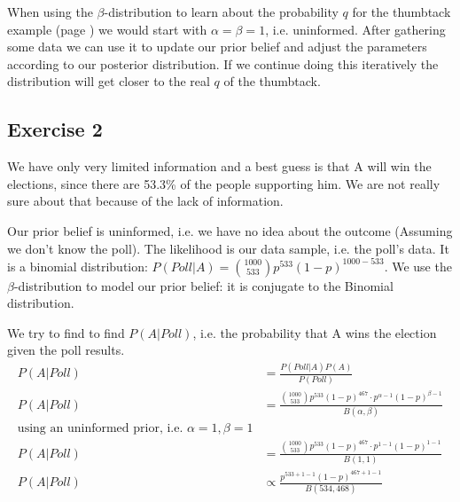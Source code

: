 \documentclass[../main/Notes.tex]{subfiles}
\begin{document}
\bigskip

When using the $\beta$-distribution to learn about the probability $q$ for the thumbtack example (page \pageref{example:Thumbtack Toss}) we would start with $\alpha=\beta=1$, i.e. uninformed. After gathering some data we can use it to update our prior belief and adjust the parameters according to our posterior distribution. If we continue doing this iteratively the distribution will get closer to the real $q$ of the thumbtack. %


\subsection*{Exercise 2}
We have only very limited information and a best guess is that A will win the elections, since there are 53.3\% of the people supporting him. We are not really sure about that because of the lack of information.

Our prior belief is uninformed, i.e. we have no idea about the outcome (Assuming we don't know the poll). The likelihood is our data sample, i.e. the poll's data. It is a binomial distribution: $P(Poll|A) = \binom{1000}{533} p^{533}(1-p)^{1000-533}$. We use the $\beta$-distribution to model our prior belief: it is conjugate to the Binomial distribution. 

We try to find to find $P(A|Poll)$, i.e. the probability that A wins the election given the poll results.
\begin{align*}
P(A|Poll) &= \frac{P(Poll|A)P(A)}{P(Poll)}\\
P(A|Poll) &= \frac{\binom{1000}{533}p^{533}(1-p)^{467} \cdot p^{\alpha-1}(1-p)^{\beta-1}}{B(\alpha,\beta)}\\
\text{using an uninformed prior, i.e. }\alpha=1, \beta=1\\
P(A|Poll) &= \frac{\binom{1000}{533}p^{533}(1-p)^{467} \cdot p^{1-1}(1-p)^{1-1}}{B(1,1)}\\
P(A|Poll) &\propto \frac{p^{533+1-1}(1-p)^{467+1-1}}{B(534,468)}
\end{align*}
\end{document}
